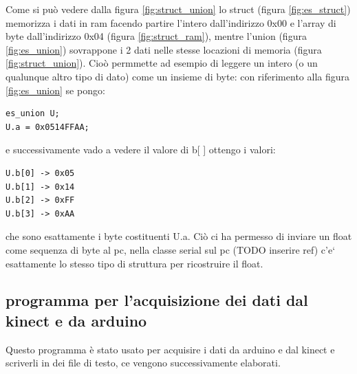 \documentclass[10pt,a4paper]{article}
\begin{document}
Come si pu\`o vedere dalla figura \ref{fig:struct_union} lo struct (figura \ref{fig:es_struct}) memorizza i dati in ram facendo partire l'intero dall'indirizzo 0x00 e l'array di byte dall'indirizzo 0x04 (figura \ref{fig:struct_ram}), mentre l'union (figura \ref{fig:es_union}) sovrappone i 2 dati nelle stesse locazioni di memoria (figura \ref{fig:struct_union}).
Cio\`o permmette ad esempio di leggere un intero (o un qualunque altro tipo di dato) come un insieme di byte: con riferimento alla figura \ref{fig:es_union} se pongo:
\begin{lstlisting}[style=myArduino, caption=classe "serial", captionpos=b, label={lst:es_union}]
es_union U;
U.a = 0x0514FFAA;
\end{lstlisting}
e successivamente vado a vedere il valore di b[ ] ottengo i valori:
\begin{lstlisting}[style=myoutput, caption=classe "serial", captionpos=b, label={lst:es_union}]
U.b[0] -> 0x05
U.b[1] -> 0x14
U.b[2] -> 0xFF
U.b[3] -> 0xAA
\end{lstlisting}
che sono esattamente i byte costituenti U.a. Ci\`o ci ha permesso di inviare un float come sequenza di byte al pc, nella classe serial sul pc (TODO inserire ref) c'e` esattamente lo stesso tipo di struttura per ricostruire il float. 

\subsection{programma per l'acquisizione dei dati dal kinect e da arduino}
Questo programma \`e stato usato per acquisire i dati da arduino e dal kinect e scriverli in dei file di testo, ce vengono successivamente elaborati. 
%
%
\end{document}
